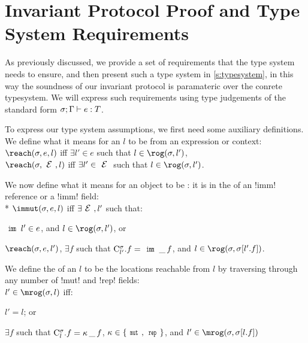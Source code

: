 \section{Invariant Protocol Proof and Type System Requirements}

\lstset{language=FortyFour} %
\label{s:proof}
As previously discussed, we provide a set of requirements that the type system needs to ensure, and then present such a type system in \ref{s:typesystem}, in this way the soundness of our invariant protocol is paramateric over the conrete typesystem.
We will express such requirements using type judgements of the standard form $\ty{e}{T}$.


To express our type system assumptions, we first need some auxiliary definitions. We define what it means for an $l$ to be \reach from an expression or context:\\
\indent $\reach(\s, e, l)$ iff $\exists l' \in e$ such that $l \in \rog(\s, l')$,\\
\indent $\reach(\s, \E, l)$ iff $\exists l' \in \E$ such that $l \in \rog(\s, l')$.

\noindent We now define what it means for an object to be \immut: it is in the \rog of an \Q!imm! reference or a \reach \Q!imm! field:\\*
\indent $\immut(\s, e, l)$ iff $\exists \E, l'$ such that:
\begin{iitemize}
\item $\Kw{imm}\,l' \in e$, and $l \in \rog(\s, l')$, or
\item $\reach(\s, e, l')$, $\exists f$ such that $\C{l'}.f = \field{\Kw{imm}}{\_}{f}$, and $l \in \rog(\s, \s[l'.f])$.
\end{iitemize}

\noindent We define the \mrog of an $l$ to be the locations reachable from $l$ by traversing through any number of \Q!mut! and \Q!rep! fields:\\
\indent $l' \in \mrog(\s, l)$ iff:%
\begin{iitemize}
	\item $l' = l$; or
	\item $\exists f$ such that $\mathrm{C}^{\sigma}_{l}.f = {\kappa}\,\_\,f$, $\fmdf \in \{\Kw{mut},\Kw{rep}\}$, and $l' \in \mrog(\s, \s[l.f])$
\end{iitemize}

